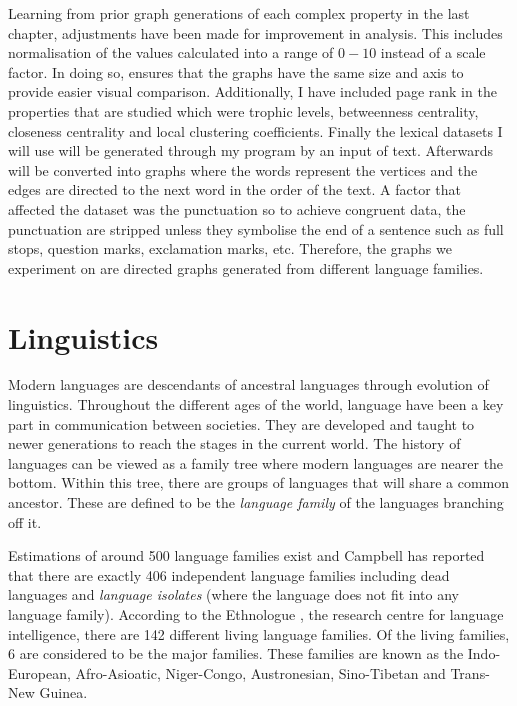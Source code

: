 Learning from prior graph generations of each complex property in the last chapter, adjustments have been made for improvement in analysis. This includes normalisation of the values calculated into a range of $0-10$ instead of a scale factor. In doing so, ensures that the graphs have the same size and axis to provide easier visual comparison. Additionally, I have included page rank in the properties that are studied which were trophic levels, betweenness centrality, closeness centrality and local clustering coefficients. Finally the lexical datasets I will use will be generated through my program by an input of text. Afterwards will be converted into graphs where the words represent the vertices and the edges are directed to the next word in the order of the text. A factor that affected the dataset was the punctuation so to achieve congruent data, the punctuation are stripped unless they symbolise the end of a sentence such as full stops, question marks, exclamation marks, etc. Therefore, the graphs we experiment on are directed graphs generated from different language families.

\section{Linguistics}
Modern languages are descendants of ancestral languages through evolution of linguistics. Throughout the different ages of the world, language have been a key part in communication between societies. They are developed and taught to newer generations to reach the stages in the current world. The history of languages can be viewed as a family tree where modern languages are nearer the bottom. Within this tree, there are groups of languages that will share a common ancestor. These are defined to be the \emph{language family} of the languages branching off it.

Estimations of around 500 language families exist and Campbell \cite{campbell2018many} has reported that there are exactly 406 independent language families including dead languages and \emph{language isolates} (where the language does not fit into any language family). According to the Ethnologue \cite{eberhard2023a}, the research centre for language intelligence, there are 142 different living language families. Of the living families, 6 are considered to be the major families. These families are known as the Indo-European, Afro-Asioatic, Niger-Congo, Austronesian, Sino-Tibetan and Trans-New Guinea.

